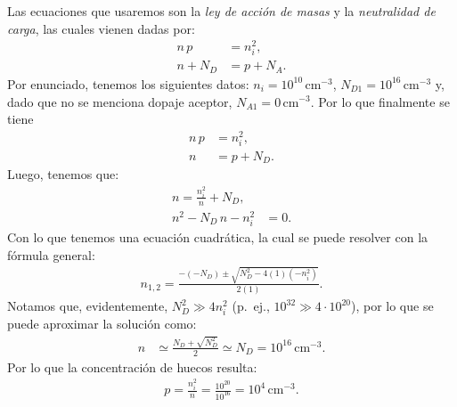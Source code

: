 Las ecuaciones que usaremos son la \textit{ley de acción de masas} y la \textit{neutralidad de carga}, las cuales vienen dadas por:
\begin{align}
n\,p &= n_i^{2},\\
n + N_D &= p + N_A.
\end{align}
Por enunciado, tenemos los siguientes datos: \(n_i = 10^{10} \,\text{cm}^{-3}\), \(N_{D1} = 10^{16} \,\text{cm}^{-3}\) y, dado que no se menciona dopaje aceptor, \(N_{A1} = 0 \,\text{cm}^{-3}\). Por lo que finalmente se tiene 
\begin{align}
n\,p &= n_i^{2},\\
n &= p + N_D.
\end{align}
Luego, tenemos que:
\begin{align}
    n= \frac{n_i^2}{n} + N_{D},\\
    n^2 - N_D\, n - n_i^2 &= 0.
\end{align}
Con lo que tenemos una ecuación cuadrática, la cual se puede resolver con la fórmula general:
\begin{align}
    n_{1,2}=\frac{-(-N_D)\pm\sqrt{N_D^{2}-4(1)(-n_i^{2})}}{2(1)}.
\end{align}
Notamos que, evidentemente, \(N_D^2 \gg 4n_i^2\) (p.\ ej., \(10^{32}\gg 4\cdot 10^{20}\)), por lo que se puede aproximar la solución como:
\begin{align}
    n &\simeq \frac{N_D+\sqrt{N_D^2}}{2} \simeq N_D = 10^{16}\,\text{cm}^{-3}.
\end{align}
Por lo que la concentración de huecos resulta:
\begin{align}
    p=\frac{n_i^2}{n}=\frac{10^{20}}{10^{16}}=10^{4}\,\text{cm}^{-3}.
\end{align}

